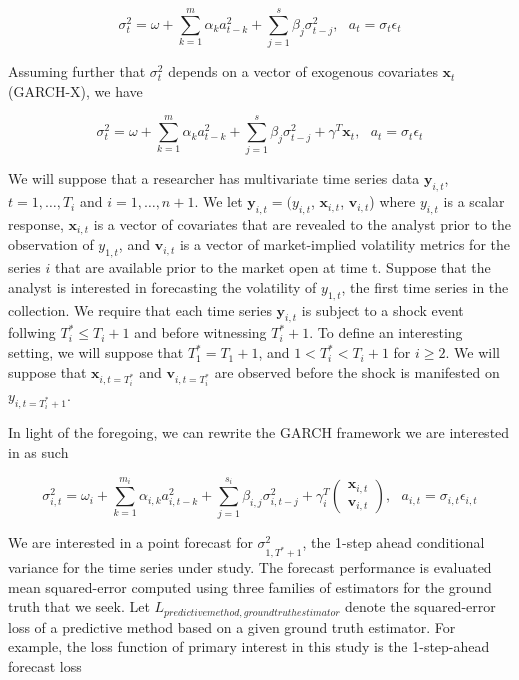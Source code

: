 \documentclass[11pt]{article}
\newcommand{\x}{\textbf{x}}
\newcommand{\y}{\textbf{y}}
\theoremstyle{definition}
\begin{document}
$$\sigma_{t}^{2} = \omega + \sum^{m}_{k=1}\alpha_{k}a^{2}_{t-k} + \sum_{j=1}^{s}\beta_{j}\sigma_{t-j}^{2},\text{ }  a_{t} = \sigma_{t}\epsilon_{t}$$

Assuming further that $\sigma^{2}_{t}$ depends on a vector of exogenous covariates $\x_{t}$ (GARCH-X), we have

$$\sigma_{t}^{2} = \omega+ \sum^{m}_{k=1}\alpha_{k}a^{2}_{t-k} + \sum_{j=1}^{s}\beta_{j}\sigma_{t-j}^{2} + \gamma^{T}\x_{t}, \text{ } a_{t} = \sigma_{t}\epsilon_{t}$$


We will suppose that a researcher has multivariate time series data $\y_{i,t}$, $t = 1, \ldots,  T_i$ and $i = 1, \ldots, n+1$. We let $\y_{i,t} = (y_{i,t}$, $\x_{i,t}$, $\textbf{v}_{i,t}$) where $y_{i,t}$ is a scalar response,  $\x_{i,t}$ is a vector of covariates that are revealed to the analyst prior to the observation of $y_{1,t}$, and $\textbf{v}_{i,t}$ is a vector of market-implied volatility metrics for the series $i$ that are available prior to the market open at time t.  Suppose that the analyst is interested in forecasting the volatility of $y_{1,t}$, the first time series in the collection.  We require that each time series $\y_{i,t}$ is subject to a shock event follwing $T^*_i \leq T_i + 1$ and before witnessing $T^*_i+1$. To define an interesting setting, we will suppose that $T^*_1 = T_1 + 1$, and $1 < T^*_i < T_i + 1$ for $i \geq 2$. 
We will suppose that $\x_{i,t=T^*_i}$ and $\textbf{v}_{i,t=T^*_i}$ are observed before the shock is manifested on $y_{i,t=T^*_i+1}$.

In light of the foregoing, we can rewrite the GARCH framework we are interested in as such

$$\sigma_{i,t}^{2} = \omega_{i} + \sum^{m_{i}}_{k=1}\alpha_{i,k}a^{2}_{i,t-k} + \sum_{j=1}^{s_{i}}\beta_{i,j}\sigma_{i,t-j}^{2} + \gamma_{i}^{T} \begin{pmatrix}
          \x_{i,t} \\
           \textbf{v}_{i,t}
           \end{pmatrix}, \text{ } a_{i,t} = \sigma_{i,t}\epsilon_{i,t}$$


We are interested in a point forecast for $\sigma^{2}_{1,T^{*}+1}$, the 1-step ahead conditional variance for the time series under study.  The forecast performance is evaluated mean squared-error computed using three families of estimators for the ground truth that we seek.  Let $L_{predictive method, ground truth estimator} $ denote the squared-error loss of a predictive method based on a given ground truth estimator.  For example, the loss function of primary interest in this study is the 1-step-ahead forecast loss
\end{document}
